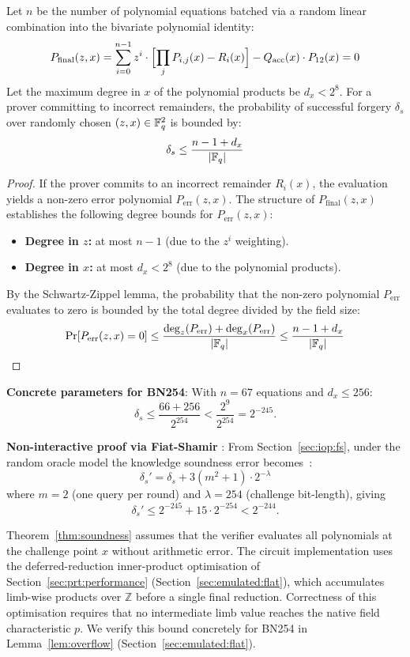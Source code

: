 \begin{theorem}[Soundness]\label{thm:soundness}
Let $n$ be the number of polynomial equations batched via a random linear combination into the bivariate polynomial identity:
$$P_{\mathrm{final}}(z, x) = \sum_{i=0}^{n-1} z^i \cdot \Bigl[\prod_{j} P_{i,j}(x) - R_i(x)\Bigr] - Q_{\mathrm{acc}}(x) \cdot P_{12}(x) = 0$$
Let the maximum degree in $x$ of the polynomial products be $d_x < 2^8$. For a prover committing to incorrect remainders, the probability of successful forgery $\delta_s$ over randomly chosen $(z,x) \in \mathbb{F}_q^2$ is bounded by:
$$\delta_s \leq \frac{n - 1 + d_x}{|\mathbb{F}_q|}$$
\end{theorem}

\begin{proof}
If the prover commits to an incorrect remainder $R_i(x)$, the evaluation yields a non-zero error polynomial $P_{\mathrm{err}}(z, x)$. The structure of $P_{\mathrm{final}}(z, x)$ establishes the following degree bounds for $P_{\mathrm{err}}(z, x)$:
\begin{itemize}
    \item \textbf{Degree in $z$:} at most $n - 1$ (due to the $z^i$ weighting).
    \item \textbf{Degree in $x$:} at most $d_x < 2^8$ (due to the polynomial products).
\end{itemize}
By the Schwartz-Zippel lemma, the probability that the non-zero polynomial $P_{\mathrm{err}}$ evaluates to zero is bounded by the total degree divided by the field size:
$$\Pr[P_{\mathrm{err}}(z, x) = 0] \leq \frac{\deg_z(P_{\mathrm{err}}) + \deg_x(P_{\mathrm{err}})}{|\mathbb{F}_q|} \leq \frac{n - 1 + d_x}{|\mathbb{F}_q|}$$
\end{proof}

\textbf{Concrete parameters for BN254}: With $n = 67$ equations and $d_x \leq 256$:
$$\delta_s \leq \frac{66 + 256}{2^{254}} < \frac{2^9}{2^{254}} = 2^{-245}.$$

\textbf{Non-interactive proof via Fiat-Shamir} \label{sec:iop:soundness:fs}: From Section~\ref{sec:iop:fs}, under the random oracle model the
knowledge soundness error becomes~\cite{IOP-NI}:
$$\delta_s' = \delta_s + 3(m^2 + 1) \cdot 2^{-\lambda}$$
where $m = 2$ (one query per round) and $\lambda = 254$ (challenge bit-length), giving
$$\delta_s' \leq 2^{-245} + 15 \cdot 2^{-254} < 2^{-244}.$$

\begin{remark}\label{rem:overflow}
Theorem~\ref{thm:soundness} assumes that the verifier evaluates all polynomials at the
challenge point $x$ without arithmetic error.  The circuit implementation uses the
deferred-reduction inner-product optimisation of Section~\ref{sec:prt:performance}
(Section~\ref{sec:emulated:flat}), which accumulates limb-wise products over $\mathbb{Z}$
before a single final reduction.  Correctness of this optimisation requires that no
intermediate limb value reaches the native field characteristic $p$.  We verify this
bound concretely for BN254 in Lemma~\ref{lem:overflow} (Section~\ref{sec:emulated:flat}).
\end{remark}


